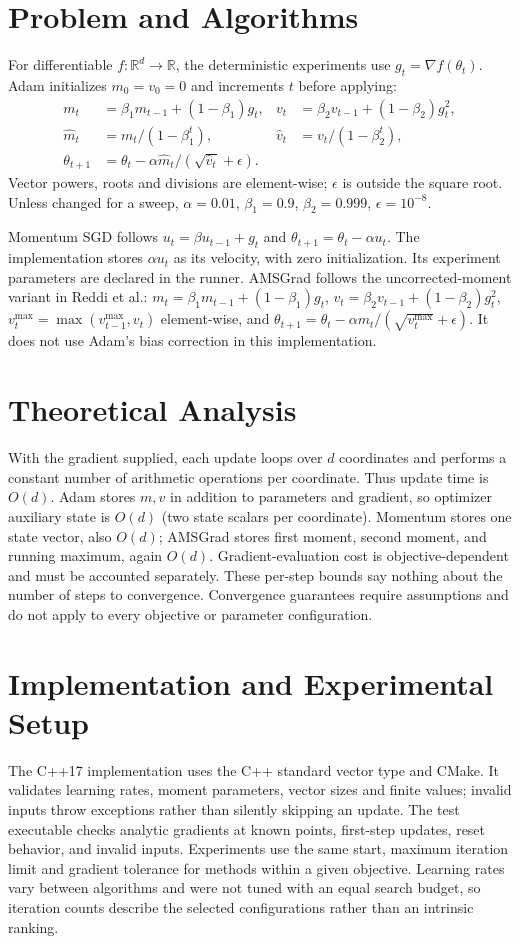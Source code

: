 \documentclass[conference]{IEEEtran}
\begin{document}
\section{Problem and Algorithms}
For differentiable $f:\mathbb{R}^d\to\mathbb{R}$, the deterministic experiments use $g_t=\nabla f(\theta_t)$. Adam initializes $m_0=v_0=0$ and increments $t$ before applying:
\begin{align}
m_t&=\beta_1m_{t-1}+(1-\beta_1)g_t, &v_t&=\beta_2v_{t-1}+(1-\beta_2)g_t^2,\\
\hat m_t&=m_t/(1-\beta_1^t), &\hat v_t&=v_t/(1-\beta_2^t),\\
\theta_{t+1}&=\theta_t-\alpha\hat m_t/(\sqrt{\hat v_t}+\epsilon).
\end{align}
Vector powers, roots and divisions are element-wise; $\epsilon$ is outside the square root. Unless changed for a sweep, $\alpha=0.01$, $\beta_1=0.9$, $\beta_2=0.999$, $\epsilon=10^{-8}$.

Momentum SGD follows $u_t=\beta u_{t-1}+g_t$ and $\theta_{t+1}=\theta_t-\alpha u_t$. The implementation stores $\alpha u_t$ as its velocity, with zero initialization. Its experiment parameters are declared in the runner. AMSGrad follows the uncorrected-moment variant in Reddi et al.: $m_t=\beta_1m_{t-1}+(1-\beta_1)g_t$, $v_t=\beta_2v_{t-1}+(1-\beta_2)g_t^2$, $v_t^{\max}=\max(v_{t-1}^{\max},v_t)$ element-wise, and $\theta_{t+1}=\theta_t-\alpha m_t/(\sqrt{v_t^{\max}}+\epsilon)$. It does not use Adam's bias correction in this implementation.
\section{Theoretical Analysis}
With the gradient supplied, each update loops over $d$ coordinates and performs a constant number of arithmetic operations per coordinate. Thus update time is $O(d)$. Adam stores $m,v$ in addition to parameters and gradient, so optimizer auxiliary state is $O(d)$ (two state scalars per coordinate). Momentum stores one state vector, also $O(d)$; AMSGrad stores first moment, second moment, and running maximum, again $O(d)$. Gradient-evaluation cost is objective-dependent and must be accounted separately. These per-step bounds say nothing about the number of steps to convergence. Convergence guarantees require assumptions and do not apply to every objective or parameter configuration.
\section{Implementation and Experimental Setup}
The C++17 implementation uses the C++ standard vector type and CMake. It validates learning rates, moment parameters, vector sizes and finite values; invalid inputs throw exceptions rather than silently skipping an update. The test executable checks analytic gradients at known points, first-step updates, reset behavior, and invalid inputs. Experiments use the same start, maximum iteration limit and gradient tolerance for methods within a given objective. Learning rates vary between algorithms and were not tuned with an equal search budget, so iteration counts describe the selected configurations rather than an intrinsic ranking.
\end{document}
